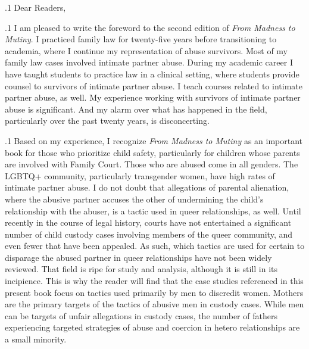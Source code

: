 \documentclass[11pt, twoside]{article}
\begin{document}
\thispagestyle{empty}

{\fontsize{13}{19}\selectfont


\hspace{-5em}\begin{minipage}{1.1\textwidth}
\begin{flushright}
{\fontsize{14}{22}\selectfont
\textbf{%
}
}
\end{flushright}
\end{minipage}


\vspace{6em}



\p.1{%
\noindent{}Dear Readers,
}%

\p.1{%
\noindent{}I am pleased to write the foreword to the second edition of
\textit{From Madness to Mutiny}. I practiced family law for twenty-five years before
transitioning to academia, where I continue my representation of abuse
survivors. Most of my family law cases involved intimate partner abuse.
During my academic career I have taught students to practice law in a
clinical setting, where students provide counsel to survivors of intimate
partner abuse. I teach courses related to intimate partner abuse, as well.
My experience working with survivors of intimate partner
abuse is significant. And my alarm over what has happened in the field, particularly
over the past twenty years, is disconcerting.
}%

\p.1{%
Based on my experience, I recognize \textit{From Madness to Mutiny} as an
important book for those who prioritize child safety, particularly for
children whose parents are involved with Family Court. Those who
are abused come in all genders. The LGBTQ+ community, particularly
transgender women, have high rates of intimate partner abuse. I do not
doubt that allegations of parental alienation, where the abusive partner accuses the other of undermining the child's relationship with the
abuser, is a tactic used in queer relationships, as well. Until recently
in the course of legal history, courts have not entertained a significant
number of child custody cases involving members of the queer community, and even fewer that have been appealed. As such, which tactics are
used for certain to disparage the abused partner in queer relationships
have not been widely reviewed. That field is ripe for study and analysis,
although it is still in its incipience. This is why the reader will find that
the case studies referenced in this present book focus on tactics used
primarily by men to discredit women. Mothers are the primary targets
of the tactics of abusive men in custody cases. While men can be targets
of unfair allegations in custody cases, the number of fathers experiencing targeted strategies of abuse and coercion in hetero relationships are
a small minority.
}%

}
\end{document}
